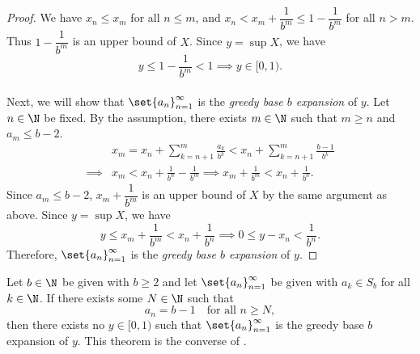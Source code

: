 \begin{proof}
    We have $x_{n} \leq x_{m}$ for all $n \leq m$, and $x_{n} < x_{m} + \dfrac{1}{b^{m}} \leq 1 - \dfrac{1}{b^{m}}$
    for all $n > m$. Thus $1 - \dfrac{1}{b^{m}}$ is an upper bound of $X$. Since $y = \sup X$, we have
    \[
    y \leq 1 - \frac{1}{b^{m}} < 1 \implies y \in [0, 1).
    \]
    \\[6mm]
    Next, we will show that $\set{a_{n}}_{n = 1}^{\infty}$ is the \emph{greedy base $b$ expansion} of $y$.
    Let $n \in \N$ be fixed. By the assumption, there exists $m \in \N$ such that $m \geq n$ and $a_{m} \leq b - 2$.
    \begin{align*}
        &x_{m} = x_{n} + \sum_{k = n + 1}^{m} \frac{a_{k}}{b^{k}} < x_{n} + \sum_{k = n + 1}^{m} \frac{b - 1}{b^{k}} \\
        \implies &x_{m} < x_{n} + \frac{1}{b^{n}} - \frac{1}{b^{m}}
        \implies x_{m} + \frac{1}{b^{m}} < x_{n} + \frac{1}{b^{n}}.
    \end{align*}
    Since $a_{m} \leq b - 2$, $x_{m} + \dfrac{1}{b^{m}}$ is an upper bound of $X$ by the same argument as above.
    Since $y = \sup X$, we have
    \[
    y \leq x_{m} + \frac{1}{b^{m}} < x_{n} + \frac{1}{b^{n}} \implies 0 \leq y - x_{n} < \frac{1}{b^{n}}.
    \]
    Therefore, $\set{a_{n}}_{n = 1}^{\infty}$ is the \emph{greedy base $b$ expansion} of $y$.
\end{proof}

\bigskip

\begin{theorem} \label{thm:NoRealNumberMatchingGreedyBaseExpansionConverse}
    Let $b \in \N$ be given with $b \geq 2$ and let $\set{a_{n}}_{n = 1}^{\infty}$ be given with $a_{k} \in S_{b}$
    for all $k \in \N$. If there exists some $N \in \N$ such that
    \[
    a_{n} = b - 1 \quad \text{for all } n \geq N,
    \]
    then there exists no $y \in [0, 1)$ such that $\set{a_{n}}_{n = 1}^{\infty}$ is the greedy base $b$ expansion of $y$.
    This theorem is the converse of .
\end{theorem}

